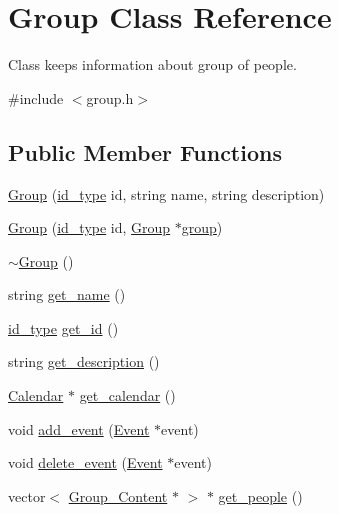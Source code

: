 \hypertarget{classGroup}{
\section{Group Class Reference}
\label{d0/db7/classGroup}
}


Class keeps information about group of people.  




{\ttfamily \#include $<$group.h$>$}

\subsection*{Public Member Functions}
\begin{DoxyCompactItemize}
\item 
\hyperlink{classGroup_ae2cf7fd2aae55c47454fa3072ccc45f1}{Group} (\hyperlink{types_8h_a0b60c08a3ab1435cccc5643d32d8ccee}{id\_\-type} id, string name, string description)
\item 
\hyperlink{classGroup_a7c5c25f4cba55a5913e93f77dc1a6fc0}{Group} (\hyperlink{types_8h_a0b60c08a3ab1435cccc5643d32d8ccee}{id\_\-type} id, \hyperlink{classGroup}{Group} $\ast$\hyperlink{group__content_8h_a27517aa1480ab2d9bfe5d62e693b33eb}{group})
\item 
\hyperlink{classGroup_aed00a22ff227ee2657ae44a5cbcedf7c}{$\sim$Group} ()
\item 
string \hyperlink{classGroup_aab2e4ec29eda3a490dede01eb9411f03}{get\_\-name} ()
\item 
\hyperlink{types_8h_a0b60c08a3ab1435cccc5643d32d8ccee}{id\_\-type} \hyperlink{classGroup_abdd86767799c3c3b6d2f7204b1945bd3}{get\_\-id} ()
\item 
string \hyperlink{classGroup_ade4eb90fbeb5f50dfb2ccb262cd39ce8}{get\_\-description} ()
\item 
\hyperlink{classCalendar}{Calendar} $\ast$ \hyperlink{classGroup_a10f85a428de5c1215fd7d319bd1a9ca3}{get\_\-calendar} ()
\item 
void \hyperlink{classGroup_a8888e1a6507d004f3b5317fc9a65f005}{add\_\-event} (\hyperlink{classEvent}{Event} $\ast$event)
\item 
void \hyperlink{classGroup_a70b5f6f47818f5d4912926b29faa96bf}{delete\_\-event} (\hyperlink{classEvent}{Event} $\ast$event)
\item 
vector$<$ \hyperlink{structGroup__Content}{Group\_\-Content} $\ast$ $>$ $\ast$ \hyperlink{classGroup_a8578c69459be6971dd31e76357f934dc}{get\_\-people} ()
\item 

\end{DoxyCompactItemize}
